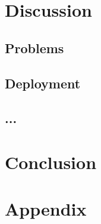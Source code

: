 \documentclass[a4paper]{article}
\begin{document}
\section{Discussion}
\subsection{Problems}
\subsection{Deployment}

\subsection{...}


\section{Conclusion}

\section{Appendix}

\end{document}
